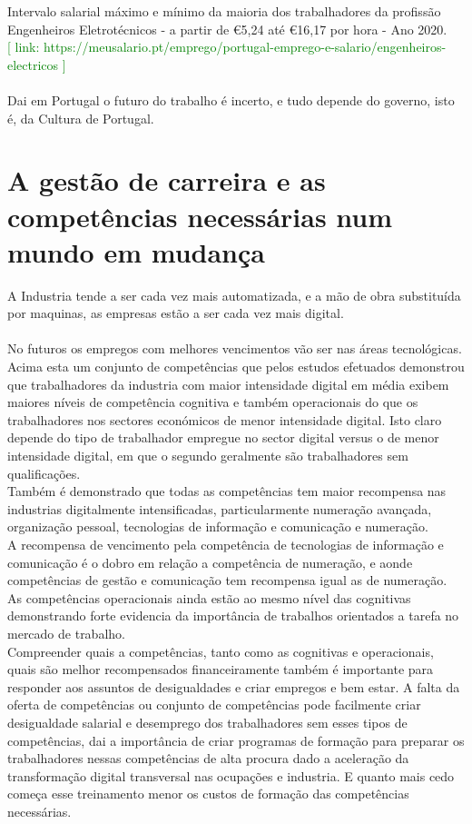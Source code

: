 Intervalo salarial máximo e mínimo da maioria dos trabalhadores da profissão Engenheiros Eletrotécnicos - a partir de \euro 5,24 até \euro 16,17 por hora - Ano 2020. \\
\textcolor{green}{[ link: \quad  https://meusalario.pt/emprego/portugal-emprego-e-salario/engenheiros-electricos ]} \\
\\
Dai em Portugal o futuro do trabalho é incerto, e tudo depende do governo, isto é, da Cultura de Portugal.
\newpage
\section{A gestão de carreira e as competências necessárias num mundo em mudança}
\qquad A Industria tende a ser cada vez mais automatizada, e a mão de obra substituída por maquinas, as empresas estão a ser cada vez mais digital.\\
\\
No futuros os empregos com melhores vencimentos vão ser nas áreas tecnológicas.\\

Acima esta um conjunto de competências que pelos estudos efetuados demonstrou que trabalhadores da industria com maior intensidade digital em média exibem maiores níveis de competência cognitiva e também operacionais do que os trabalhadores nos sectores económicos de menor intensidade digital. Isto claro depende do tipo de trabalhador empregue no sector digital versus o de menor intensidade digital, em que o segundo geralmente são trabalhadores sem qualificações. \cite{article_1}\\
Também é demonstrado que todas as competências tem maior recompensa nas industrias digitalmente intensificadas, particularmente numeração avançada, organização pessoal, tecnologias de informação e comunicação e numeração. \cite{article_1}\\
A recompensa de vencimento pela competência de tecnologias de informação e comunicação é o dobro em relação a competência de numeração, e aonde competências de gestão e comunicação tem recompensa igual as de numeração. \cite{article_1}\\
As competências operacionais ainda estão ao mesmo nível das cognitivas demonstrando forte evidencia da importância de trabalhos orientados a tarefa no mercado de trabalho. \cite{article_1}\\
Compreender quais a competências, tanto como as cognitivas e operacionais, quais são melhor recompensados financeiramente também é importante para responder aos assuntos de  desigualdades e criar empregos e bem estar. A falta da oferta de competências ou conjunto de competências pode facilmente criar desigualdade salarial e desemprego dos trabalhadores sem esses tipos de competências, dai a importância de criar programas de formação para preparar os trabalhadores nessas competências de alta procura dado a aceleração da transformação digital transversal nas ocupações e industria. E quanto mais cedo começa esse treinamento menor os custos de formação das competências necessárias. \cite{article_1}\\
